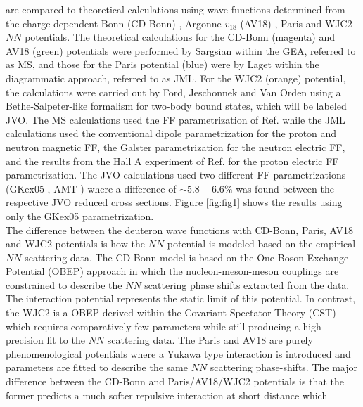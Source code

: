 \documentclass[aps,prl,twocolumn,showpacs,superscriptaddress,groupedaddress]{revtex4-2}  %
\providecommand{\DIFaddtex}[1]{{\protect\color{blue}\uwave{#1}}} %
\providecommand{\DIFaddbegin}{} %
\providecommand{\DIFaddend}{} %
\providecommand{\DIFadd}[1]{\texorpdfstring{\DIFaddtex{#1}}{#1}} %
\newcommand{\DIFaddincludegraphics}[2][]{{\color{blue}\fbox{\DIFOincludegraphics[#1]{#2}}}} %
\DeclareRobustCommand{\DIFaddbegin}{\DIFOaddbegin \let\includegraphics\DIFaddincludegraphics} %
\DeclareRobustCommand{\DIFaddend}{\DIFOaddend \let\includegraphics\DIFOincludegraphics} %
\begin{document}
\DIFaddbegin \DIFadd{The data }\DIFaddend are compared to theoretical calculations using wave functions determined from the charge-dependent Bonn (CD-Bonn) \cite{PhysRevC.63.024001}, Argonne $v_{18}$ (AV18) \cite{PhysRevC.51.38}, Paris \cite{PhysRevC.21.861} and WJC2 \cite{Gross_2007} $NN$ potentials. The theoretical calculations
for the CD-Bonn (magenta) and AV18 (green) potentials were performed by Sargsian \cite{PhysRevC.82.014612} within the GEA, referred to as MS, and those for the Paris potential (blue) were by Laget \cite{LAGET2005} within the diagrammatic approach, referred to as JML.
For the WJC2 (orange) potential, the calculations were carried out by Ford, Jeschonnek and Van Orden \cite{PhysRevC.90.064006} using a Bethe-Salpeter-like formalism for two-body bound states, which will be labeled JVO.
The MS calculations used the FF parametrization of Ref. \cite{PhysRevC.70.068202} while the JML calculations used the conventional dipole parametrization for the proton and neutron magnetic FF, the Galster \cite{Galster:1971} parametrization
for the neutron electric FF, and the results from the Hall A experiment of Ref. \cite{PhysRevLett.88.092301} for the proton electric FF parametrization. The JVO calculations used two different FF parametrizations (GKex05 \cite{PhysRevC.66.045501}, AMT \cite{PhysRevC.76.035205}) where a difference of $\sim5.8-6.6 \%$ was found between the respective
JVO reduced cross sections. Figure \ref{fig:fig1} shows the results using only the GKex05 parametrization. \\
\indent The difference between the deuteron wave functions with CD-Bonn, Paris, AV18 and WJC2 potentials is 
how the $NN$ potential is modeled based on the empirical $NN$ scattering data.
The CD-Bonn model is based on the One-Boson-Exchange Potential (OBEP) approach in which the 
nucleon-meson-meson couplings are constrained to describe the $NN$ scattering phase shifts
extracted from the data. The interaction potential represents the static limit of 
this potential. In contrast, the WJC2 is a OBEP derived within the Covariant Spectator Theory (CST) \cite{PhysRev.186.1448, PhysRevD.10.223, PhysRevC.26.2203, PhysRevC.26.2226}
which requires comparatively few parameters while still producing a high-precision fit to the $NN$ scattering data.
The Paris and AV18 are purely phenomenological potentials where a 
Yukawa type interaction is introduced and parameters are fitted to describe the 
same $NN$ scattering phase-shifts. The major difference between the CD-Bonn and Paris/AV18/WJC2 
potentials is that the former predicts a much softer repulsive interaction at short distance which 
\end{document}
